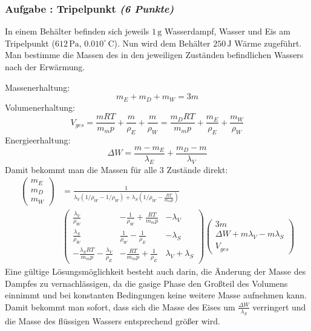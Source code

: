 \documentclass[12pt,a4paper]{article}
\newcommand{\unit}[1]{\,\mathrm{#1}}
\newcounter{numlabel}
\newenvironment{problem}[2]{\stepcounter{numlabel} \vspace{1ex} \subsubsection*{Aufgabe \the\value{numlabel}: #1 \emph{(#2 Punkte)}} \renewcommand{\Currentlabel}{Aufgabe \the\value{numlabel}: #1}}{

}
\begin{document}
\begin{problem}{Tripelpunkt}{6}
In einem Behälter befinden sich jeweils $1 \unit{g}$ Wasserdampf, Wasser und Eis am Tripelpunkt ($612 \unit{Pa}$, $0.010^\circ \unit{C}$). Nun wird dem Behälter $250 \unit{J}$ Wärme zugeführt. Man bestimme die Massen des in den jeweiligen Zuständen befindlichen Wassers nach der Erwärmung.
\begin{solution}
Massenerhaltung:\vspace{-1ex}\[
m_E + m_D + m_W = 3m
\]
Volumenerhaltung:\vspace{-1ex}\[
V_{ges}=\frac{m RT}{m_m p} + \frac{m}{\rho_E} + \frac{m}{\rho_W} = \frac{m_D RT}{m_m p} + \frac{m_E}{\rho_E} + \frac{m_W}{\rho_W}
\]
Energieerhaltung:\vspace{-1ex}\[
\Delta W = \frac{m-m_E}{\lambda_E} + \frac{m_D-m}{\lambda_V}
\]
Damit bekommt man die Massen für alle 3 Zustände direkt:
\[
\begin{split}
\begin{pmatrix}
m_E \\ m_D \\ m_W
\end{pmatrix}
&=
\frac{1}{\lambda_V (1/\rho_W - 1/\rho_W) + \lambda_S (1/\rho_W - \frac{RT}{m_m p})}\\
&\begin{pmatrix}
\frac{\lambda_V}{\rho_W} & -\frac{1}{\rho_W}+\frac{RT}{m_m p} & -\lambda_V \\
\frac{\lambda_S}{\rho_W} & \frac{1}{\rho_W}-\frac{1}{\rho_E} & -\lambda_S \\
-\frac{\lambda_S RT}{m_m p} - \frac{\lambda_V}{\rho_E} & -\frac{RT}{m_m p}+\frac{1}{\rho_E} & \lambda_V+\lambda_S
\end{pmatrix}
\begin{pmatrix}
3m \\ \Delta W + m\lambda_V - m\lambda_S \\ V_{ges}
\end{pmatrix}
\end{split}
\]
Eine gültige Lösungsmöglichkeit besteht auch darin, die Änderung der Masse des Dampfes zu vernachlässigen, da die gasige Phase den Großteil des Volumens einnimmt und bei konstanten Bedingungen keine weitere Masse aufnehmen kann. Damit bekommt man sofort, dass sich die Masse des Eises um $\frac{\Delta W}{\lambda_S}$ verringert und die Masse des flüssigen Wassers entsprechend größer wird.
\end{solution}
\end{problem}
\end{document}
